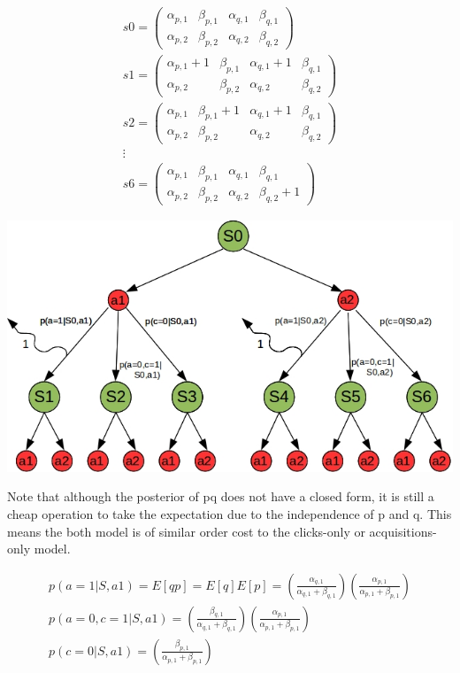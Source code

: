 \documentclass[11pt,a4,singlespacing,titlepagenumber=on]{scrreprt}
\numberwithin{equation}{chapter} %
\theoremstyle{remark}
\begin{document}
\begin{align}
s0 =
 \begin{pmatrix}
  \alpha_{p,1} & \beta_{p,1} & \alpha_{q,1} & \beta_{q,1} \\
  \alpha_{p,2} & \beta_{p,2} & \alpha_{q,2} & \beta_{q,2} 
 \end{pmatrix} \\
s1 =
  \begin{pmatrix}
   \alpha_{p,1}+1 & \beta_{p,1} & \alpha_{q,1}+1 & \beta_{q,1} \\
   \alpha_{p,2} & \beta_{p,2} & \alpha_{q,2} & \beta_{q,2} 
  \end{pmatrix} \\
s2 =
  \begin{pmatrix}
   \alpha_{p,1} & \beta_{p,1}+1 & \alpha_{q,1}+1 & \beta_{q,1} \\
   \alpha_{p,2} & \beta_{p,2} & \alpha_{q,2} & \beta_{q,2} 
  \end{pmatrix} \\
\vdots \\
s6 =
  \begin{pmatrix}
   \alpha_{p,1} & \beta_{p,1} & \alpha_{q,1} & \beta_{q,1} \\
   \alpha_{p,2} & \beta_{p,2} & \alpha_{q,2} & \beta_{q,2}+1 
  \end{pmatrix}
\end{align} 

\includegraphics[scale=0.6]{BAMDP.jpg}

Note that although the posterior of pq does not have a closed form, it is still a cheap operation to take the expectation due to the independence of p and q. This means the both model is of similar order cost to the clicks-only or acquisitions-only model.

\begin{align}
	p(a=1|S,a1) = E[qp] = E[q]E[p] = 
		\left( \frac{ \alpha_{q,1} }{ \alpha_{q,1} + \beta_{q,1} } \right)
		\left( \frac{ \alpha_{p,1} }{ \alpha_{p,1} + \beta_{p,1} } \right) \\
	p(a=0,c=1|S,a1) = 
		\left( \frac{ \beta_{q,1} }{ \alpha_{q,1} + \beta_{q,1} } \right)
		\left( \frac{ \alpha_{p,1} }{ \alpha_{p,1} + \beta_{p,1} } \right) \\
	p(c=0|S,a1) = 
		\left( \frac{ \beta_{p,1} }{ \alpha_{p,1} + \beta_{p,1} } \right) 
\end{align}	
\end{document}
